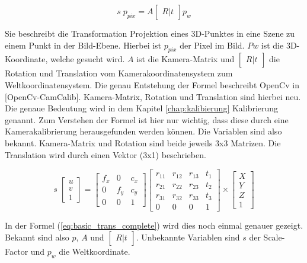 	\begin{equation}
		s \; p_{pix} = A \begin{bmatrix} R|t \end{bmatrix} p_w
		\label{eq:basic_trans}
	\end{equation}
	
	Sie beschreibt die Transformation Projektion eines 3D-Punktes in eine Szene zu einem Punkt in der Bild-Ebene. Hierbei ist \( p_{pix} \) der Pixel im Bild. \( Pw \) ist die 3D-Koordinate, welche gesucht wird. \( A \) ist die Kamera-Matrix und \( \begin{bmatrix} R|t \end{bmatrix} \) die Rotation und Translation vom Kamerakoordinatensystem zum Weltkoordinatensystem. Die genau Entstehung der Formel beschreibt OpenCv in [OpenCv-CamCalib]. Kamera-Matrix, Rotation und Translation sind hierbei neu. Die genaue Bedeutung wird in dem Kapitel \ref{chap:kalibierung} Kalibrierung genannt. Zum Verstehen der Formel ist hier nur wichtig, dass diese durch eine Kamerakalibrierung herausgefunden werden können. Die Variablen sind also bekannt. Kamera-Matrix und Rotation sind beide jeweils 3x3 Matrizen. Die Translation wird durch einen Vektor (3x1) beschrieben. 
	
	\begin{equation}
		s \; \begin{bmatrix}
		u \\ 
		v \\ 
		1
		\end{bmatrix} = \begin{bmatrix}
		f_x & 0 & c_x \\
		0 & f_y & c_y \\
		0 & 0 & 1
		\end{bmatrix} \begin{bmatrix}
		r_{11} & r_{12} & r_{13} & t_1 \\ 
		r_{21} & r_{22} & r_{23} & t_2 \\ 
		r_{31} & r_{32} & r_{33} & t_3 \\
		0 & 0 & 0 & 1
		\end{bmatrix} \times \begin{bmatrix}
		X \\ 
		Y \\ 
		Z \\
		1
		\end{bmatrix}
		\label{eq:basic_trans_complete}
	\end{equation}
	
	In der Formel (\ref{eq:basic_trans_complete}) wird dies noch einmal genauer gezeigt. Bekannt sind also \( p \), \( A \) und \( \begin{bmatrix} R|t \end{bmatrix} \). Unbekannte Variablen sind \( s \) der Scale-Factor und \( p_w \) die Weltkoordinate.
	
